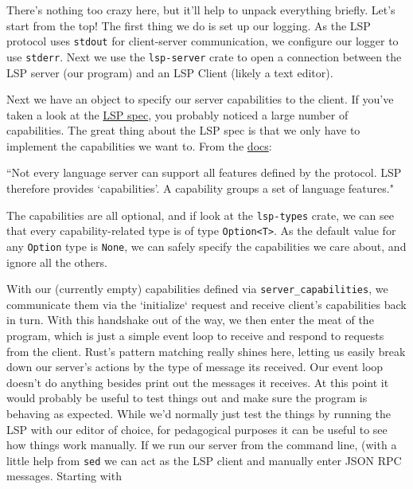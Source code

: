 There's nothing too crazy here, but it'll help to unpack everything briefly. Let's
start from the top! The first thing we do is set up our logging. As the LSP protocol
uses \texttt{stdout} for client-server communication, we configure our logger to
use \texttt{stderr}. Next we use the \texttt{lsp-server} crate to open a connection
between the LSP server (our program) and an LSP Client (likely a text editor).

Next we have an object to specify our server capabilities to the client. If you've
taken a look at the \href{https://microsoft.github.io/language-server-protocol/specifications/lsp/3.17/specification/}{LSP spec},
you probably noticed a large number of capabilities. The great thing about the LSP
spec is that we only have to implement the capabilities we want to. From the \href{https://microsoft.github.io/language-server-protocol/specifications/lsp/3.17/specification/\#capabilities}{docs}:

\begin{center}
	``Not every language server can support all features defined by the protocol.
	LSP therefore provides ‘capabilities’. A capability groups a set of language
	features."
\end{center}

The capabilities are all optional, and if look at the \texttt{lsp-types} crate, we can see
that every capability-related type is of type \texttt{Option<T>}. As the default
value for any \texttt{Option} type is \texttt{None}, we can safely specify the
capabilities we care about, and ignore all the others.

With our (currently empty) capabilities defined via \texttt{server\_capabilities},
we communicate them via the `initialize` request and receive client's capabilities
back in turn. With this handshake out of the way, we then enter the meat of the program,
which is just a simple event loop to receive and respond to requests from the client.
Rust's pattern matching really shines here, letting us easily break down our server's
actions by the type of message its received. Our event loop doesn't do anything
besides print out the messages it receives. At this point it would probably be useful
to test things out and make sure the program is behaving as expected. While we'd
normally just test the things by running the LSP with our editor of choice, for
pedagogical purposes it can be useful to see how things work manually. If we run
our server from the command line, (with a little help from \texttt{sed} we can act
as the LSP client and manually enter JSON RPC messages. Starting with

